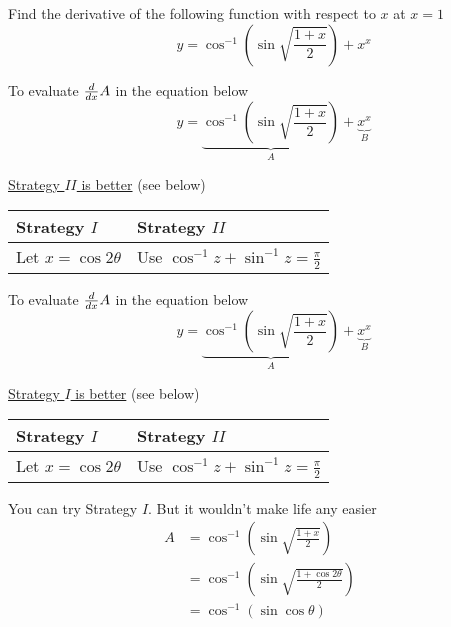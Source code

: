 \documentclass[14pt,fleqn]{extarticle}
\newcommand\fxa{\sqrt{\frac{1+x}{2}}}
\begin{document}
\begin{problem}
	\statement 
    
     Find the derivative of the following function with respect to $x$ 
     at $ x = 1$ 
     \[ \qquad y = \cos^{-1} \left(\sin\fxa \right) + x^x \] 
     
     \begin{step}
  \begin{options} 
      
     \correct 
     
      To evaluate $\frac{d}{dx} A$ in the equation below       
	\[ \qquad y = \underbrace{\cos^{-1} \left(\sin\fxa \right)}_A + \underbrace{x^x}_B \]
	
	\underline{Strategy $II$ is better} (see below) 
	
	\begin{center}
  \begin{tabular}{ll}
   \toprule
        Strategy $I$ & Strategy $II$  \\
   \midrule 
   Let $x = \cos 2\theta$ & Use $\cos^{-1} z + \sin^{-1} z = \frac\pi{2}$ \\
    \bottomrule
  \end{tabular}
\end{center}

     \incorrect

     To evaluate $\frac{d}{dx} A$ in the equation below       
	\[ \qquad y = \underbrace{\cos^{-1} \left(\sin\fxa \right)}_A + \underbrace{x^x}_B \]
	
	\underline{Strategy $I$ is better} (see below) 
	
	\begin{center}
  \begin{tabular}{ll}
   \toprule
        Strategy $I$ & Strategy $II$  \\
   \midrule 
   Let $x = \cos 2\theta$ & Use $\cos^{-1} z + \sin^{-1} z = \frac\pi{2}$ \\
    \bottomrule
  \end{tabular}
\end{center}
	
	

      
    \end{options} 
     \reason 
       
     You can try Strategy $I$. But it wouldn't make life any easier 
     \begin{align}
	   A &= \cos^{-1} \left(\sin \fxa \right) \\
	   &= \cos^{-1} \left(\sin \sqrt{\frac{1+\cos 2\theta}{2}} \right) \\
	   &= \cos^{-1} \left(\sin \cos\theta \right)
\end{align}


\end{step}
\end{problem}
\end{document}
